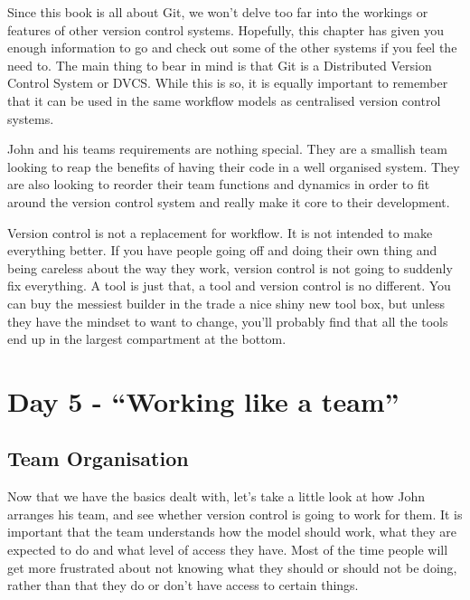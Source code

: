 Since this book is all about Git, we won't delve too far into the workings or features of other version control systems.
Hopefully, this chapter has given you enough information to go and check out some of the other systems if you feel the need to.
The main thing to bear in mind is that Git is a Distributed Version Control System or DVCS.
While this is so, it is equally important to remember that it can be used in the same workflow models as centralised version control systems.

John and his teams requirements are nothing special.
They are a smallish team looking to reap the benefits of having their code in a well organised system.
They are also looking to reorder their team functions and dynamics in order to fit around the version control system and really make it core to their development.

Version control is not a replacement for workflow.
It is not intended to make everything better.
If you have people going off and doing their own thing and being careless about the way they work, version control is not going to suddenly fix everything.
A tool is just that, a tool and version control is no different.
You can buy the messiest builder in the trade a nice shiny new tool box, but unless they have the mindset to want to change, you'll probably find that all the tools end up in the largest compartment at the bottom.

\section{Day 5 - ``Working like a team''}
\subsection{Team Organisation}
Now that we have the basics dealt with, let's take a little look at how John arranges his team, and see whether version control is going to work for them.
It is important that the team understands how the model should work, what they are expected to do and what level of access they have.
Most of the time people will get more frustrated about not knowing what they should or should not be doing, rather than that they do or don't have access to certain things.

